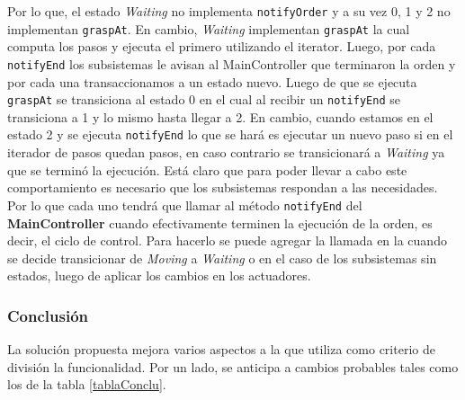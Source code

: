 Por lo que, el estado \textit{Waiting} no implementa \verb|notifyOrder| y a su vez 0, 1 y 2 no implementan \verb|graspAt|. En cambio, \textit{Waiting} implementan \verb|graspAt| la cual computa los pasos y ejecuta el primero utilizando el iterator. Luego, por cada \verb|notifyEnd| los subsistemas le avisan al MainController que terminaron la orden y por cada una transaccionamos a un estado nuevo. Luego de que se ejecuta \verb|graspAt| se transiciona al estado 0 en el cual al recibir un \verb|notifyEnd| se transiciona a 1 y lo mismo hasta llegar a 2. En cambio, cuando estamos en el estado 2 y se ejecuta \verb|notifyEnd| lo que se hará es ejecutar un nuevo paso si en el iterador de pasos quedan pasos, en caso contrario se transicionará a \textit{Waiting} ya que se terminó la ejecución. Está claro que para poder llevar a cabo este comportamiento es necesario que los subsistemas respondan a las necesidades. Por lo que cada uno tendrá que llamar al método \verb|notifyEnd| del \textbf{MainController} cuando efectivamente terminen la ejecución de la orden, es decir, el ciclo de control. Para hacerlo se puede agregar la llamada en la cuando se decide transicionar de \textit{Moving} a \textit{Waiting} o en el caso de los subsistemas sin estados, luego de aplicar los cambios en los actuadores.

\subsubsection*{Conclusión}

La solución propuesta mejora varios aspectos a la que utiliza como criterio de división la funcionalidad. Por un lado, se anticipa a cambios probables tales como los de la tabla \ref{tablaConclu}.

\begin{table}[h]
\centering
\caption{Anticipos al cambio del diseño propuesto para el brazo robótico.}
\label{tablaConclu}
\end{table}

